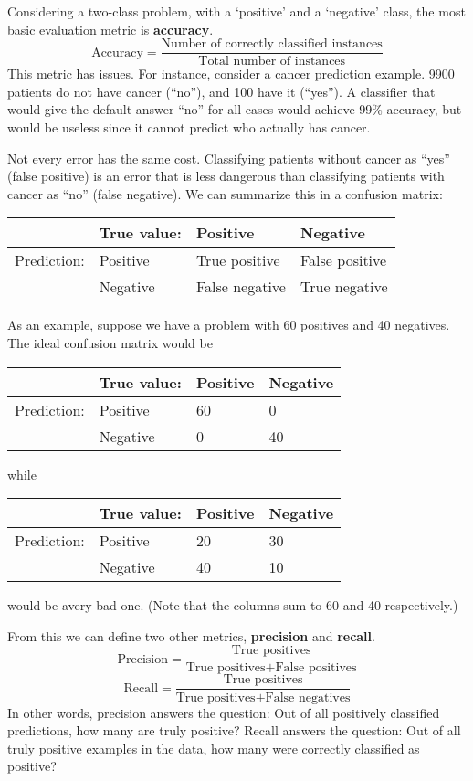 \documentclass[a4paper,12pt]{article}
\begin{document}
Considering a two-class problem, with a `positive' and a `negative' class, the most basic evaluation metric is \textbf{accuracy}. 
$$\text{Accuracy} = \frac{\text{Number of correctly classified instances}}{\text{Total number of instances}}$$
This metric has issues. For instance, consider a cancer prediction example. 9900 patients do not have cancer (``no''), and 100 have it (``yes''). A classifier that would give the default answer ``no'' for all cases would achieve 99\% accuracy, but would be useless since it cannot predict who actually has cancer. 

Not every error has the same cost. Classifying patients without cancer as ``yes'' (false positive) is an error that is less dangerous than classifying patients with cancer as ``no'' (false negative). We can summarize this in a confusion matrix: 

\begin{tabular}{l|l|l|l}
		    & True value: &  Positive	   & Negative \\
		    \hline
Prediction: & Positive    & True positive  & False positive \\
		    & Negative    & False negative & True negative 
\end{tabular}

As an example, suppose we have a problem with 60 positives and 40 negatives. The ideal confusion matrix would be

\begin{tabular}{l|l|l|l}
		    & True value: &  Positive	   & Negative \\
		    \hline
Prediction: & Positive    & 60  & 0 \\
		    & Negative    & 0   & 40 
\end{tabular}

while 

\begin{tabular}{l|l|l|l}
		    & True value: &  Positive	   & Negative \\
		    \hline
Prediction: & Positive    & 20   & 30 \\
		    & Negative    & 40   & 10 
\end{tabular}

would be avery bad one. (Note that the columns sum to 60 and 40 respectively.)

From this we can define two other metrics, \textbf{precision} and \textbf{recall}. 
$$\text{Precision} = \frac{\text{True positives}}{\text{True positives} + \text{False positives}}$$
$$\text{Recall} = \frac{\text{True positives}}{\text{True positives} + \text{False negatives}}$$
In other words, precision answers the question: Out of all positively classified predictions, how many are truly positive? Recall answers the question: Out of all truly positive examples in the data, how many were correctly classified as positive?
\end{document}
